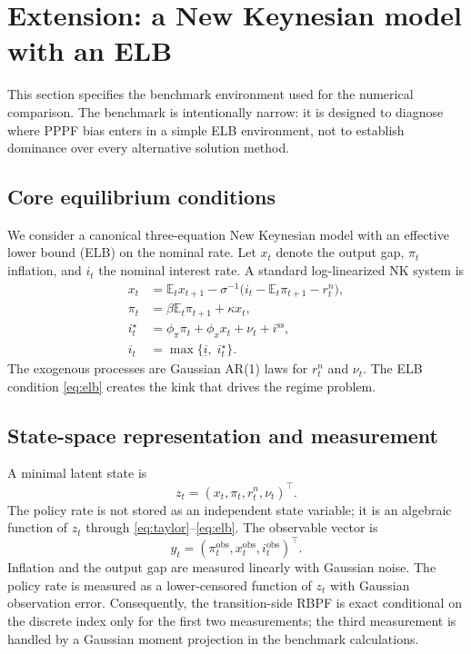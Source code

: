 \documentclass[11pt]{article}
\theoremstyle{remark}
\newcommand{\E}{\mathbb{E}}
\begin{document}
\section{Extension: a New Keynesian model with an ELB}
\label{sec:nk_benchmark}

This section specifies the benchmark environment used for the numerical comparison.
The benchmark is intentionally narrow: it is designed to diagnose where PPPF bias enters in a simple ELB environment, not to establish dominance over every alternative solution method.

\subsection{Core equilibrium conditions}

We consider a canonical three-equation New Keynesian model with an effective lower bound (ELB) on the nominal rate.
Let $x_t$ denote the output gap, $\pi_t$ inflation, and $i_t$ the nominal interest rate.
A standard log-linearized NK system is
\begin{align}
x_t &= \E_t x_{t+1} - \sigma^{-1}\Big(i_t - \E_t \pi_{t+1} - r_t^n\Big), \label{eq:nk_is}\\
\pi_t &= \beta \E_t \pi_{t+1} + \kappa x_t, \label{eq:nk_pc}\\
i_t^\star &= \phi_\pi \pi_t + \phi_x x_t + \nu_t + i^{\mathrm{ss}}, \label{eq:taylor}\\
i_t &= \max\{ \underline i,\; i_t^\star\}. \label{eq:elb}
\end{align}
The exogenous processes are Gaussian AR(1) laws for $r_t^n$ and $\nu_t$.
The ELB condition \eqref{eq:elb} creates the kink that drives the regime problem.

\subsection{State-space representation and measurement}

A minimal latent state is
\[
z_t=(x_t,\pi_t,r_t^n,\nu_t)^\top.
\]
The policy rate is not stored as an independent state variable; it is an algebraic function of $z_t$ through \eqref{eq:taylor}--\eqref{eq:elb}.
The observable vector is
\[
y_t=(\pi_t^{\mathrm{obs}},x_t^{\mathrm{obs}},i_t^{\mathrm{obs}})^\top.
\]
Inflation and the output gap are measured linearly with Gaussian noise.
The policy rate is measured as a lower-censored function of $z_t$ with Gaussian observation error.
Consequently, the transition-side RBPF is exact conditional on the discrete index only for the first two measurements; the third measurement is handled by a Gaussian moment projection in the benchmark calculations.
\end{document}
